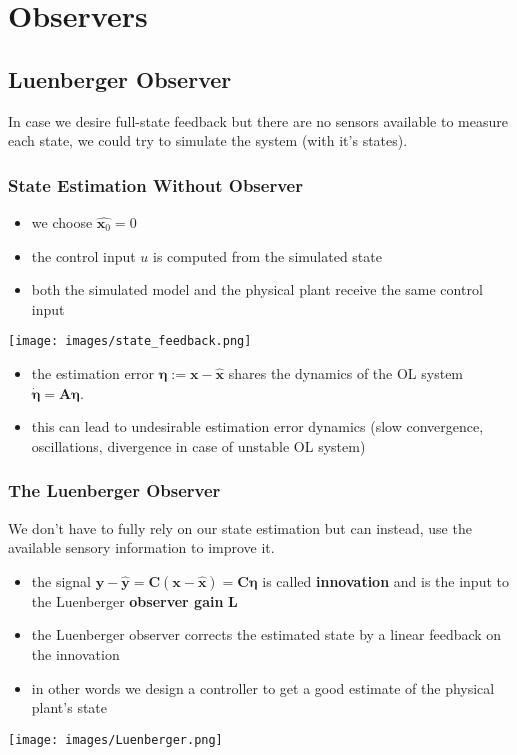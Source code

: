 \section{Observers}
\subsection{Luenberger Observer}
In case we desire full-state feedback but there are no sensors available to measure each state, we could try to simulate the system (with it's states).
\subsubsection{State Estimation Without Observer}
\begin{itemize}
    \item we choose $\hat{\mathbf{x}_0}=0$
    \item the control input $u$ is computed from the simulated state
    \item both the simulated model and the physical plant receive the same control input
\end{itemize}
\begin{center}
    \texttt{[image: images/state\_feedback.png]}\\
\end{center}

\begin{itemize}
    \item the estimation error $\mathbf{\eta}:=\mathbf{x}-\hat{\mathbf{x}}$ shares the dynamics of the OL system $\dot{\mathbf{\eta}}=\mathbf{A}\mathbf{\eta}$.
    \item this can lead to undesirable estimation error dynamics (slow convergence, oscillations, divergence in case of unstable OL system)
\end{itemize}

\subsubsection{The Luenberger Observer}
We don't have to fully rely on our state estimation but can instead, use the available sensory information to improve it.
\begin{itemize}
    \item the signal $\mathbf{y}-\hat{\mathbf{y}}=\mathbf{C}(\mathbf{x}-\hat{\mathbf{x}}) = \mathbf{C}\mathbf{\eta}$ is called \textbf{innovation} and is the input to the Luenberger \textbf{observer gain} $\mathbf{L}$
    \item the Luenberger observer corrects the estimated state by a linear feedback on the innovation
    \item in other words we design a controller to get a good estimate of the physical plant's state
\end{itemize}
\begin{center}
    \texttt{[image: images/Luenberger.png]}
\end{center}

